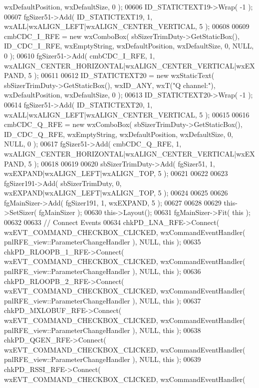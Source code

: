 \begin{DoxyCode}
      wxDefaultPosition, wxDefaultSize, 0 );
00606     ID_STATICTEXT19->Wrap( -1 );
00607     fgSizer51->Add( ID_STATICTEXT19, 1, wxALL|wxALIGN\_LEFT|wxALIGN\_CENTER\_VERTICAL, 5 );
00608     
00609     cmbCDC_I_RFE = \textcolor{keyword}{new} wxComboBox( sbSizerTrimDuty->GetStaticBox(), ID_CDC_I_RFE, wxEmptyString, 
      wxDefaultPosition, wxDefaultSize, 0, NULL, 0 ); 
00610     fgSizer51->Add( cmbCDC_I_RFE, 1, wxALIGN\_CENTER\_HORIZONTAL|wxALIGN\_CENTER\_VERTICAL|wxEXPAND, 5 );
00611     
00612     ID_STATICTEXT20 = \textcolor{keyword}{new} wxStaticText( sbSizerTrimDuty->GetStaticBox(), wxID\_ANY, wxT(\textcolor{stringliteral}{"Q channel:"}), 
      wxDefaultPosition, wxDefaultSize, 0 );
00613     ID_STATICTEXT20->Wrap( -1 );
00614     fgSizer51->Add( ID_STATICTEXT20, 1, wxALL|wxALIGN\_LEFT|wxALIGN\_CENTER\_VERTICAL, 5 );
00615     
00616     cmbCDC_Q_RFE = \textcolor{keyword}{new} wxComboBox( sbSizerTrimDuty->GetStaticBox(), ID_CDC_Q_RFE, wxEmptyString, 
      wxDefaultPosition, wxDefaultSize, 0, NULL, 0 ); 
00617     fgSizer51->Add( cmbCDC_Q_RFE, 1, wxALIGN\_CENTER\_HORIZONTAL|wxALIGN\_CENTER\_VERTICAL|wxEXPAND, 5 );
00618     
00619     
00620     sbSizerTrimDuty->Add( fgSizer51, 1, wxEXPAND|wxALIGN\_LEFT|wxALIGN\_TOP, 5 );
00621     
00622     
00623     fgSizer191->Add( sbSizerTrimDuty, 0, wxEXPAND|wxALIGN\_LEFT|wxALIGN\_TOP, 5 );
00624     
00625     
00626     fgMainSizer->Add( fgSizer191, 1, wxEXPAND, 5 );
00627     
00628     
00629     this->SetSizer( fgMainSizer );
00630     this->Layout();
00631     fgMainSizer->Fit( \textcolor{keyword}{this} );
00632     
00633     \textcolor{comment}{// Connect Events}
00634     chkPD_LNA_RFE->Connect( wxEVT\_COMMAND\_CHECKBOX\_CLICKED, wxCommandEventHandler( 
      pnlRFE_view::ParameterChangeHandler ), NULL, \textcolor{keyword}{this} );
00635     chkPD_RLOOPB_1_RFE->Connect( wxEVT\_COMMAND\_CHECKBOX\_CLICKED, wxCommandEventHandler( 
      pnlRFE_view::ParameterChangeHandler ), NULL, \textcolor{keyword}{this} );
00636     chkPD_RLOOPB_2_RFE->Connect( wxEVT\_COMMAND\_CHECKBOX\_CLICKED, wxCommandEventHandler( 
      pnlRFE_view::ParameterChangeHandler ), NULL, \textcolor{keyword}{this} );
00637     chkPD_MXLOBUF_RFE->Connect( wxEVT\_COMMAND\_CHECKBOX\_CLICKED, wxCommandEventHandler( 
      pnlRFE_view::ParameterChangeHandler ), NULL, \textcolor{keyword}{this} );
00638     chkPD_QGEN_RFE->Connect( wxEVT\_COMMAND\_CHECKBOX\_CLICKED, wxCommandEventHandler( 
      pnlRFE_view::ParameterChangeHandler ), NULL, \textcolor{keyword}{this} );
00639     chkPD_RSSI_RFE->Connect( wxEVT\_COMMAND\_CHECKBOX\_CLICKED, wxCommandEventHandler( 

\end{DoxyCode}
